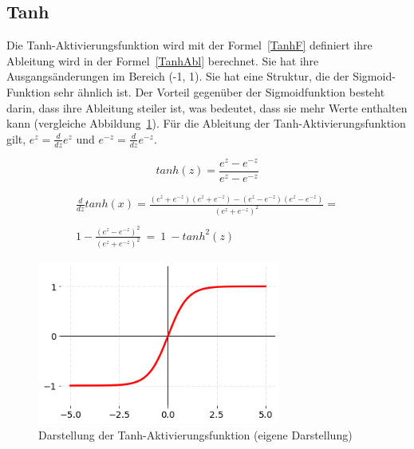 \subsection{Tanh}
Die Tanh-Aktivierungsfunktion wird mit der Formel~\ref{TanhF} definiert ihre Ableitung wird in der Formel~\ref{TanhAbl} berechnet. Sie hat ihre Ausgangsänderungen im Bereich (-1, 1). Sie hat eine Struktur, die der Sigmoid-Funktion sehr ähnlich ist. Der Vorteil gegenüber der Sigmoidfunktion besteht darin, dass ihre Ableitung steiler ist, was bedeutet, dass sie mehr Werte enthalten kann (vergleiche Abbildung~\ref{Kap2:Tanh_plot}). Für die Ableitung der Tanh-Aktivierungsfunktion gilt, $e^z = \frac{d}{dz}e^z$ und $e^{-z} = \frac{d}{dz}e^{-z}$.

\begin{equation} \label{TanhF}
    tanh(z) = \frac{e^{z}-e^{-z}}{e^{z}-e^{-z}}
\end{equation}

\begin{equation} \label{TanhAbl}
    \begin{array}{ c }
        \frac{d}{dz} tanh( x) =\frac{\left( e^{z} +e^{-z}\right)\left( e^{z} +e^{-z}\right) -\left( e^{z} -e^{-z}\right)\left( e^{z} -e^{-z}\right)}{\left( e^{z} +e^{-z}\right)^{2}} = \\
        \\
        1-\frac{\left( e^{z} -e^{-z}\right)^{2}}{\left( e^{z} +e^{-z}\right)^{2}} \ =\ 1\ -tanh^{2}( z)
    \end{array}
\end{equation}

\begin{figure}[H]
    \centering
    \includegraphics[width=8cm]{kapitel2/tanh_plot.png}
    \caption[Darstellung der Tanh-Aktivierungsfunktion]{Darstellung der Tanh-Aktivierungsfunktion (eigene Darstellung)}
    \label{Kap2:Tanh_plot}
\end{figure}

